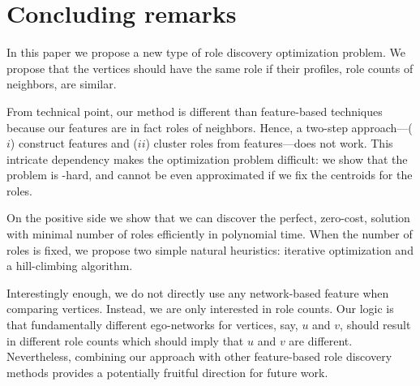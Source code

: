 \section{Concluding remarks}
\label{sec:conclusions}

In this paper we propose a new type of role discovery optimization problem.  We
propose that the vertices should have the same role if their profiles, role
counts of neighbors, are similar.

From technical point, our method is different than feature-based techniques
because our features are in fact roles of neighbors. Hence, a two-step
approach---($i$) construct features and ($ii$) cluster roles from
features---does not work. This intricate dependency makes the optimization
problem difficult: we show that the problem is \np-hard, and cannot be even approximated if we fix the
centroids for the roles.

On the positive side we show that we can discover the perfect, zero-cost,
solution with minimal number of roles efficiently in polynomial time. When the
number of roles is fixed, we propose two simple natural heuristics: iterative
optimization and a hill-climbing algorithm.

Interestingly enough, we do not directly use any network-based feature when
comparing vertices. Instead, we are only interested in role counts. Our logic
is that fundamentally different ego-networks for vertices, say, $u$ and $v$,
should result in different role counts which should imply that $u$ and $v$ are
different. Nevertheless, combining our approach with other feature-based role
discovery methods provides a potentially fruitful direction for future work. 

